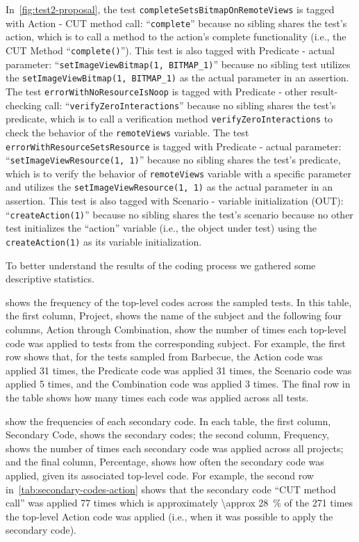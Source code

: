 In~\cref{fig:test2-proposal}, the test \texttt{complete\-Sets\-Bitmap\-On\-Remote\-Views} is tagged with Action - CUT method call: \enquote{\texttt{complete}} because no sibling shares the test’s action, which is to call a method to the action’s complete functionality (i.e., the CUT Method \enquote{\texttt{complete()}}).
%
This test is also tagged with Predicate - actual parameter: \enquote{\texttt{setImageViewBitmap(1, BITMAP\_1)}} because no sibling test utilizes the \texttt{setImageViewBitmap(1, BITMAP\_1)} as the actual parameter in an assertion.
%
The test \texttt{error\-With\-No\-Resource\-Is\-Noop} is tagged with Predicate - other result-checking call: \enquote{\texttt{verifyZeroInteractions}} because no sibling shares the test’s predicate, which is to call a verification method \texttt{verifyZeroInteractions} to check the behavior of the \texttt{remoteViews} variable.
%
The test \texttt{error\-With\-Resource\-Sets\-Resource} is tagged with Predicate - actual parameter: \enquote{\texttt{setImageViewResource(1, 1)}} because no sibling shares the test’s predicate, which is to verify the behavior of \texttt{remoteViews} variable with a specific parameter and utilizes the \texttt{setImageViewResource(1, 1)} as the actual parameter in an assertion.
%
This test is also tagged with Scenario - variable initialization (OUT): \enquote{\texttt{createAction(1)}} because no sibling shares the test’s scenario because no other test initializes the \enquote{action} variable (i.e., the object under test) using the \texttt{createAction(1)} as its variable initialization.


To better understand the results of the coding process we gathered some descriptive statistics.

 shows the frequency of the top-level codes across the sampled tests.
%
In this table, the first column, Project, shows the name of the subject and the following four columns, Action through Combination, show the number of times each top-level code was applied to tests from the corresponding subject.
%
For example, the first row shows that, for the tests sampled from Barbecue, the Action code was applied \num{31} times, the Predicate code was applied \num{31} times, the Scenario code was applied \num{5} times, and the Combination code was applied \num{3} times.
%
The final row in the table shows how many times each code was applied across all tests.

 show the frequencies of each secondary code.
%
In each table, the first column, Secondary Code, shows the secondary codes; the second column, Frequency, shows the number of times each secondary code was applied across all projects; and the final column, Percentage, shows how often the secondary code was applied, given its associated top-level code.
%
For example, the second row in~\cref{tab:secondary-codes-action} shows that the secondary code \enquote{CUT method call} was applied \num{77} times which is approximately \SI{\approx 28}{\percent} of the \num{271} times the top-level Action code was applied (i.e., when it was possible to apply the secondary code).

